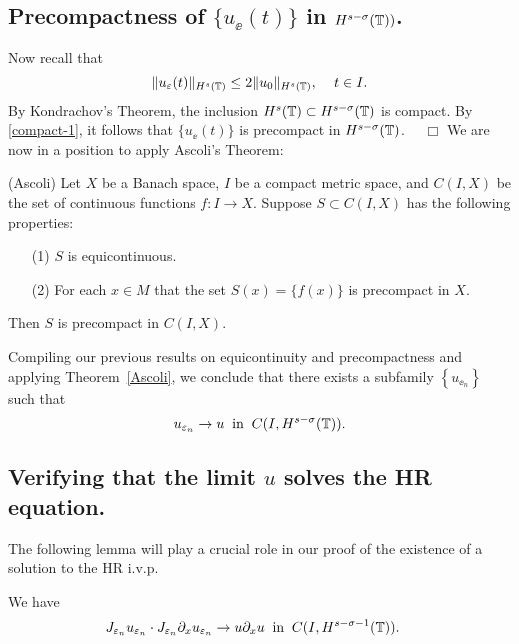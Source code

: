 \subsection{Precompactness of $\{u_\ee(t)\}$ in $H^{s-\sigma}(\mathbb{T}))$.}
Now recall that
\begin{equation}
\label{compact-1}
\|u_\varepsilon(t)\|_{H^{s}(\mathbb{T})}
\le
2 \|u_0 \|_{H^s(\mathbb{T})}, \,
\quad
t\in I.
\end{equation}
%
By Kondrachov's Theorem, the inclusion $H^s(\mathbb{T}) \subset H^{s-
\sigma }(\mathbb{T})$ is compact. By \eqref{compact-1},
it follows that $\{u_\ee(t)\}$ is precompact in $H^{s-\sigma}(\mathbb{T})$.
$\quad \Box$
%
%
%
%
We are now in a position to apply Ascoli's Theorem: 
\begin{theorem}
\label{Ascoli}
(Ascoli)  Let $X$ be a Banach space, $I$ be a compact metric space,
and $C(I,X)$  be the set of continuous functions $f: I\longrightarrow X$.
Suppose $S \subset C(I,X)$  has the following properties:
%
\begin{itemize}
\item[(1)]   $S$ is  equicontinuous.
\item[(2)]  For each $x \in M$ that the set $S(x) = \{f(x)\}$  is  precompact in $X$.
\end{itemize} 
%
Then $S$  is  precompact  in  $C(I,X)$.
\end{theorem}
Compiling our previous results on equicontinuity and precompactness
and applying Theorem~\ref{Ascoli}, we
conclude that there exists a subfamily $\left\{ u_{\ee_n} \right\}$
such that
\begin{equation}
\label{strong-conv-of-u_ep}
u_{\varepsilon_n} \to u \; \; \text{in} \; \; C(I, H^{s-\sigma}(\mathbb{T})).
\end{equation}
%
%
%
%
%
%
%
\subsection{Verifying that the limit $u$ solves the HR equation.} 
The following lemma will play a crucial role in our proof of the
existence of a solution to the HR i.v.p.
\begin{lemma}
\label{lem:cc}
We have
\begin{equation}
\begin{split}
\label{burgers_and_nonlocal_conv}
&  J_{\varepsilon_n} u_{\varepsilon_n} 
\cdot J_{\varepsilon_n} \partial_x u_{\varepsilon_n} 
\to  u \partial_x u \; \; 
\text{in} \; \;
C(I, H^{s-\sigma-1}(\mathbb{T})). 
\end{split}
\end{equation}
\end{lemma}
%
